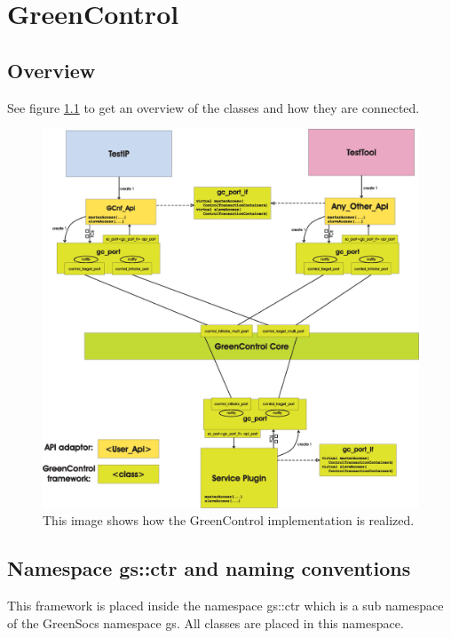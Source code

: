 
\cleardoublepage

\chapter{GreenControl}
\label{GreenControl}

\section{Overview}

See figure \ref{fig:GreenControlImpl} to get an overview of the \GreenControl classes and how they are connected.

\begin{figure}%
	\centerline{
	\includegraphics[width=\textwidth]{GreenControlImpl2.eps}
	} 
	\caption{This image shows how the GreenControl implementation is realized. }
	\label{fig:GreenControlImpl}
\end{figure}


\section{Namespace gs::ctr and naming conventions}
\label{GreenControlNamespaceAndConventions}
This framework is placed inside the namespace {\sffamily gs::ctr} which is a sub namespace of the GreenSocs namespace {\sffamily gs}. All \GreenControl classes are placed in this namespace.

